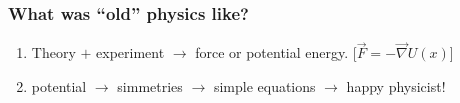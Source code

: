 \documentclass[ukenglish]{beamer}
\begin{document}
\begin{frame}
    \frametitle{What was ``old'' physics like?}
    \begin{enumerate}
        \item 
    Theory $+$ experiment $\longrightarrow$ force or potential energy.
    [$\vec{F} = -\vec{\nabla}U(x)$]
\item potential $\rightarrow$ simmetries $\rightarrow$ simple equations
    $\rightarrow$ happy physicist!
    \end{enumerate}
\end{frame}
\end{document}

